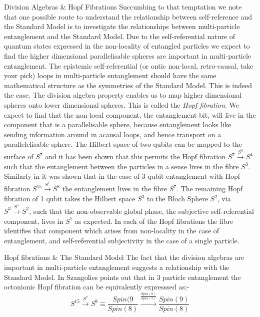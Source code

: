 \documentclass[final]{beamer}
\newlength{\colwidth}
\begin{document}
\begin{frame}[t]
\begin{columns}[t]
\begin{column}{\colwidth}
\begin{block}{Division Algebras \& Hopf Fibrations}
Succumbing to that temptation we note that one possible route to understand the relationship between self-reference and the Standard Model is to investigate the relationships between multi-particle entanglement and the Standard Model. Due to the self-referential nature of quantum states expressed in the non-locality of entangled particles we expect to find the higher dimensional parallelisable spheres are important in multi-particle entanglement. The epistemic self-referential (or ontic non-local, retro-causal, take your pick) loops in multi-particle entanglement should have the same mathematical structure as the symmetries of the Standard Model. This is indeed the case. The division algebra property enables us to map higher dimensional spheres onto lower dimensional spheres. This is called the \emph{Hopf fibration}. We expect to find that the non-local component, the entanglement bit, will live in the component that is a parallelisable sphere, because entanglement looks like sending information around in acausal loops, and hence transport on a parallelelisable sphere.  The Hilbert space of two qubits can be mapped to the surface of $S^7$ and it has been shown \autocite{mosseri_2001} that this permits the Hopf fibration $S^7 \xrightarrow{S^3} S^4$ such that the entanglement between the particles in a sense lives in the fibre $S^3$. Similarly in \autocite{mosseri_2003} it was shown that in the case of 3 qubit entanglement with Hopf fibration $S^{15} \xrightarrow{S^7} S^8$ the entanglement lives in the fibre $S^7$. The remaining Hopf fibration of 1 qubit takes the Hilbert space $S^3$ to the Bloch Sphere $S^2$, via $S^3 \xrightarrow{S^1} S^2$, such that the non-observable global phase, the subjective self-referential component, lives in $S^1$ as expected. In each of the Hopf fibrations the fibre identifies that component which arises from non-locality in the case of entanglement, and self-referential subjectivity in the case of a single particle.
\end{block}
\begin{block}{Hopf fibrations \& The Standard Model}
The fact that the division algebras are important in multi-particle entanglement suggests a relationship with the Standard Model. In \autocite{Szangolies_J_not_yet_published, szangolies_j_2021} Szangolies points out that in 3 particle entanglement the octonionic Hopf fibration can be equivalently expresssed as;-
\begin{equation}
S^{15} \xrightarrow{S^7} S^8 \equiv \frac{Spin(9}{Spin(8)} \xrightarrow{\frac{Spin(8)}{Spin(7)}} \frac{Spin(9)}{Spin(8)}    

\end{equation}
\end{block}
\end{column}
\end{columns}
\end{frame}
\end{document}
